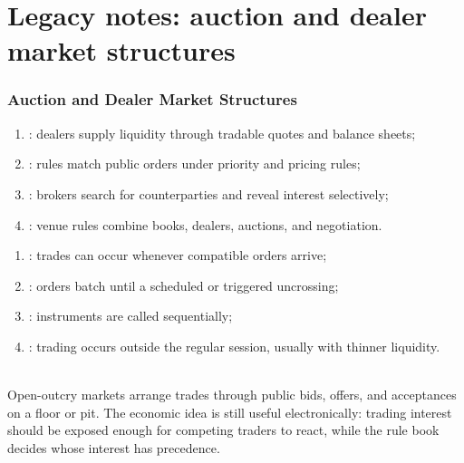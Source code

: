 \documentclass[a4paper,oneside,openany]{book}
\begin{document}
\chapter*{Legacy notes: auction and dealer market structures}

\subsection*{Auction and Dealer Market Structures}

\begin{taxonomy} 
\begin{enumerate}[label=\roman*.]
\setlength{\itemsep}{0pt}
\item {}: dealers supply liquidity through tradable quotes and balance sheets;
\item {}: rules match public orders under priority and pricing rules;
\item {}: brokers search for counterparties and reveal interest selectively;
\item {}: venue rules combine books, dealers, auctions, and negotiation.
\end{enumerate}
\end{taxonomy}

\begin{taxonomy} 
\begin{enumerate}[label=\roman*.]
\setlength{\itemsep}{0pt}
\item {}: trades can occur whenever compatible orders arrive;
\item {}: orders batch until a scheduled or triggered uncrossing;
\item {}: instruments are called sequentially;
\item {}: trading occurs outside the regular session, usually with thinner liquidity.
\end{enumerate}
\end{taxonomy}

\begin{mechanism} \\
Open-outcry markets arrange trades through public bids, offers, and acceptances on a floor or pit. The economic idea is still useful electronically: trading interest should be exposed enough for competing traders to react, while the rule book decides whose interest has precedence.
\end{mechanism}
\end{document}
